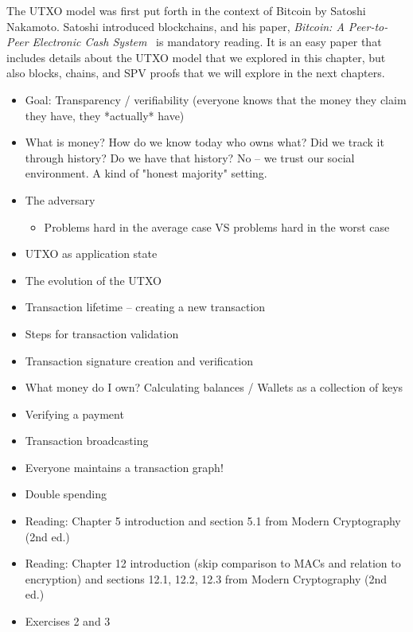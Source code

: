 The UTXO model was first put forth in the context of Bitcoin by Satoshi Nakamoto. Satoshi
introduced blockchains, and his paper, \emph{Bitcoin: A Peer-to-Peer Electronic Cash System}~\cite{bitcoin} is
mandatory reading. It is an easy paper that includes details about the UTXO model that we explored
in this chapter, but also blocks, chains, and SPV proofs that we will explore in the next chapters.

{\color{red}
\begin{itemize}
\item
  Goal: Transparency / verifiability (everyone knows that the money they claim they have, they *actually* have)
\item
  What is money? How do we know today who owns what? Did we track it through history? Do we have that history? No -- we trust our social environment. A kind of "honest majority" setting.
\item The adversary
  \begin{itemize}
    \item Problems hard in the average case VS problems hard in the worst case
  \end{itemize}
\item UTXO as application state
\item The evolution of the UTXO
\item Transaction lifetime -- creating a new transaction
\item Steps for transaction validation
\item Transaction signature creation and verification
\item What money do I own? Calculating balances / Wallets as a collection of keys
\item Verifying a payment
\item Transaction broadcasting
\item Everyone maintains a transaction graph!
\item Double spending
\item Reading: Chapter 5 introduction and section 5.1 from Modern Cryptography (2nd ed.)
\item Reading: Chapter 12 introduction (skip comparison to MACs and relation to encryption) and sections 12.1, 12.2, 12.3 from Modern Cryptography (2nd ed.)
\item Exercises 2 and 3
\end{itemize}
}
